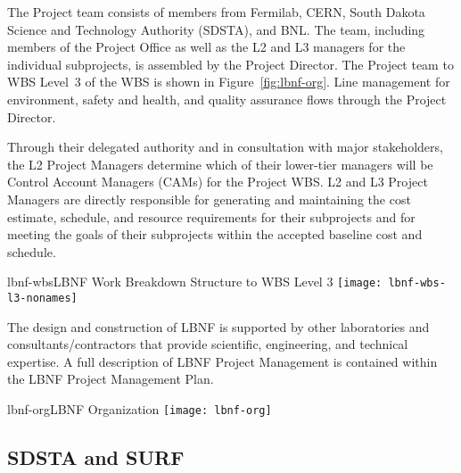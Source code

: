 The Project team consists of members from Fermilab, CERN, South Dakota Science and Technology Authority (SDSTA), and BNL.  The team, including members of the Project Office as well as the L2 and L3 managers for the individual subprojects, is assembled by the Project Director. The Project team to WBS Level~3 of the WBS is shown in Figure~\ref{fig:lbnf-org}. 
Line management for environment, safety and health, and quality assurance flows through the Project Director. 


Through their delegated authority and in consultation with major stakeholders, the L2 Project Managers determine which of their lower-tier managers will be Control Account Managers (CAMs) for the Project WBS. L2 and L3 Project Managers are directly responsible for generating and maintaining the cost estimate, schedule, and resource requirements for their subprojects and for meeting the goals of their subprojects within the accepted baseline cost and schedule. 

\begin{cdrfigure}{lbnf-wbs}{LBNF Work Breakdown Structure to WBS Level 3}
  \texttt{[image: lbnf-wbs-l3-nonames]}
\end{cdrfigure}

The design and construction of LBNF is supported by other laboratories and consultants/contractors that provide scientific, engineering, and technical expertise. A full description of LBNF Project Management is contained within the LBNF Project Management Plan. \fixme{[ref]}

\begin{cdrfigure}{lbnf-org}{LBNF Organization}
  \texttt{[image: lbnf-org]}
\end{cdrfigure}




\subsection{SDSTA and SURF}

